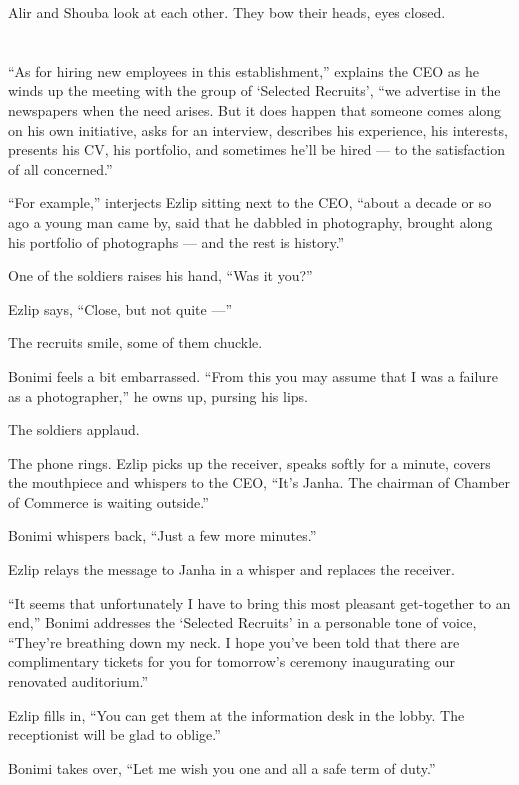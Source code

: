 \documentclass[twoside,11pt]{book}
\begin{document}
Alir and Shouba look at each other. They bow their heads, eyes closed.


\chapter{}

``As for hiring new employees in this establishment,{}'' explains the CEO as he winds up the meeting with
the group of `Selected Recruits', ``we advertise in the newspapers when the need arises. But it does happen that
someone comes along on his own initiative, asks for an interview, describes his experience, his interests, presents his
CV, his portfolio, and sometimes he'll be hired --- to the satisfaction of all concerned.''

``For example,'' interjects Ezlip sitting next to the CEO, ``about a decade or so
ago a young man came by, said that he dabbled in photography, brought along his portfolio of photographs --- and the rest
is history.''

One of the soldiers raises his hand, ``Was it you?''

Ezlip says, ``Close, but not quite ---''

The recruits smile, some of them chuckle{.}

Bonimi feels a bit embarrassed. ``From this you may assume that I was a failure as a
photographer,'' he owns up, pursing his lips.

The soldiers applaud.

The phone rings. Ezlip picks up the receiver, speaks softly for a minute, covers the mouthpiece and whispers to the CEO,
``It's Janha. The chairman of Chamber of Commerce is waiting outside.''

Bonimi whispers back, ``Just a few more minutes.''

Ezlip relays the message to Janha in a whisper and replaces the receiver.

``It seems that unfortunately I have to bring this most pleasant get-together to an
end,'' Bonimi addresses the `Selected Recruits' in a personable tone of voice, ``They're
breathing down my neck. I hope you've been told that there are complimentary tickets for you for
tomorrow's ceremony inaugurating our renovated auditorium.''

Ezlip fills in, ``You can get them at the information desk in the lobby. The receptionist will be glad to
oblige.''

Bonimi takes over, ``Let me wish you one and all a safe term of duty.''
\end{document}
